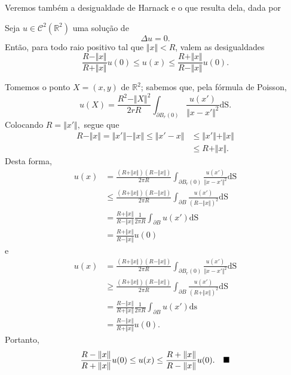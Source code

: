 \documentclass[../pde_notes.tex]{subfiles}
\begin{document}
Veremos também a desigualdade de Harnack e o que resulta dela, dada por
\hypertarget{harnack_inequality}{
	\begin{theorem*}
		Seja \(u\in \mathcal{C}^{2}(\mathbb{R}^{2})\) uma solução de
		\[
			\Delta u = 0.
		\]
		Então, para todo raio positivo tal que \(\Vert x \Vert<R\), valem as desigualdades
		\[
			\frac{R-\Vert x \Vert}{R+\Vert x \Vert}u(0)\leq u(x)\leq \frac{R+\Vert x \Vert}{R-\Vert x \Vert}u(0).
		\]
	\end{theorem*}
}
\begin{proof*}
	Tomemos o ponto \(X=(x, y)\) de \(\mathbb{R}^{2}\); sabemos que, pela fórmula de Poisson,
	\[
		u(X) = \frac{R^{2}-\Vert X \Vert^{2}}{2rR}\int_{\partial B_{r}(0)}^{}\frac{u(x')}{\Vert x-x' \Vert^{2}} \mathrm{dS}.
	\]
	Colocando \(R = \Vert x' \Vert,\) segue que
	\begin{align*}
		R-\Vert x \Vert = \Vert x' \Vert-\Vert x \Vert \leq \Vert x'-x \Vert & \leq \Vert x' \Vert+\Vert x \Vert \\
		                                                                     & \leq R+\Vert x \Vert.
	\end{align*}
	Desta forma,
	\begin{align*}
		u(x) & = \frac{(R+\Vert x \Vert)(R-\Vert x \Vert)}{2\pi R}\int_{\partial B_r(0)}^{}\frac{u(x')}{\Vert x-x' \Vert^{2}} \mathrm{dS} \\
		     & \leq \frac{(R+\Vert x \Vert)(R-\Vert x \Vert)}{2\pi R}\int_{\partial B}^{}\frac{u(x')}{(R-\Vert x \Vert)^{2}} \mathrm{dS}  \\
		     & = \frac{R+\Vert x \Vert}{R-\Vert x \Vert}\frac{1}{2\pi R}\int_{\partial B}^{}u(x') \mathrm{dS}                             \\
		     & =\frac{R+\Vert x \Vert}{R-\Vert x \Vert}u(0)
	\end{align*}
	e
	\begin{align*}
		u(x) & = \frac{(R+\Vert x \Vert)(R-\Vert x \Vert)}{2\pi R}\int_{\partial B_r(0)}^{}\frac{u(x')}{\Vert x-x' \Vert^{2}} \mathrm{dS} \\
		     & \geq \frac{(R+\Vert x \Vert)(R-\Vert x \Vert)}{2\pi R}\int_{\partial B}^{}\frac{u(x')}{(R+\Vert x \Vert)^{2}} \mathrm{dS}  \\
		     & = \frac{R-\Vert x \Vert}{R+\Vert x \Vert}\frac{1}{2\pi R}\int_{\partial B}^{}u(x') \mathrm{ds}                             \\
		     & = \frac{R-\Vert x \Vert}{R+\Vert x \Vert}u(0).
	\end{align*}
	Portanto,
	\[
		\frac{R-\Vert x \Vert}{R+\Vert x \Vert}u(0)\leq u(x)\leq \frac{R+\Vert x \Vert}{R-\Vert x \Vert}u(0). \quad \text{$\blacksquare$}
	\]
\end{proof*}
\end{document}
